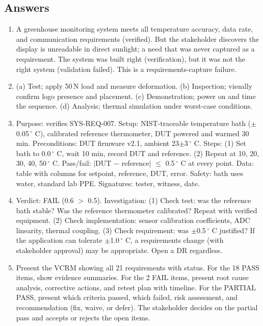 \subsection{Answers}
\begin{enumerate}[leftmargin=1.5em]
\item A greenhouse monitoring system meets all temperature accuracy, data rate, and communication requirements (verified). But the stakeholder discovers the display is unreadable in direct sunlight; a need that was never captured as a requirement. The system was built right (verification), but it was not the right system (validation failed). This is a requirements-capture failure.
\item (a) Test; apply 50\,N load and measure deformation. (b) Inspection; visually confirm logo presence and placement. (c) Demonstration; power on and time the sequence. (d) Analysis; thermal simulation under worst-case conditions.
\item Purpose: verifies SYS-REQ-007. Setup: NIST-traceable temperature bath ($\pm$0.05\,$^{\circ}$ C), calibrated reference thermometer, DUT powered and warmed 30 min. Preconditions: DUT firmware v2.1, ambient 23$\pm$3\,$^{\circ}$ C. Steps: (1) Set bath to 0.0\,$^{\circ}$ C, wait 10 min, record DUT and reference. (2) Repeat at 10, 20, 30, 40, 50\,$^{\circ}$ C. Pass/fail: $|$DUT $-$ reference$|$ $\leq$ 0.5\,$^{\circ}$ C at every point. Data: table with columns for setpoint, reference, DUT, error. Safety: bath uses water, standard lab PPE. Signatures: tester, witness, date.
\item Verdict: FAIL (0.6 $>$ 0.5). Investigation: (1) Check test: was the reference bath stable? Was the reference thermometer calibrated? Repeat with verified equipment. (2) Check implementation: sensor calibration coefficients, ADC linearity, thermal coupling. (3) Check requirement: was $\pm$0.5\,$^{\circ}$ C justified? If the application can tolerate $\pm$1.0\,$^{\circ}$ C, a requirements change (with stakeholder approval) may be appropriate. Open a DR regardless.
\item Present the VCRM showing all 21 requirements with status. For the 18 PASS items, show evidence summaries. For the 2 FAIL items, present root cause analysis, corrective actions, and retest plan with timeline. For the PARTIAL PASS, present which criteria passed, which failed, risk assessment, and recommendation (fix, waive, or defer). The stakeholder decides on the partial pass and accepts or rejects the open items.
\end{enumerate}


